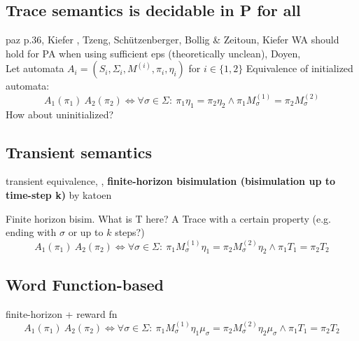         \subsection{Trace semantics is decidable in P for all}
                \begin{definition}
                 
                \end{definition}

                paz p.36, Kiefer  , Tzeng, Schützenberger, Bollig \& Zeitoun, Kiefer WA should hold for PA when using sufficient eps (theoretically unclean), Doyen, \\
                Let automata $A_i = \left( S_i, \Sigma_i, M^{(i)}, \pi_i, \eta_i \right)$ for $i \in \{1, 2\}$
                Equivalence of initialized automata:
                \[ A_1(\pi_1) ~ A_2(\pi_2) \Leftrightarrow \forall \sigma \in \Sigma: \ \pi_1 \eta_1 = \pi_2 \eta_2 \wedge \pi_1 M^{(1)}_{\sigma} = \pi_2 M^{(2)}_{\sigma}  \]
                How about uninitialized?  \\
                
        \subsection{Transient semantics}
        \begin{definition}
         transient equivalence, , \textbf{finite-horizon bisimulation (bisimulation up to time-step k)} by katoen
        \end{definition}

            Finite horizon bisim.
            What is T here? A Trace with a certain property (e.g. ending with $\sigma$ or up to $k$ steps?)
            \[ A_1(\pi_1) ~ A_2(\pi_2) \Leftrightarrow \forall \sigma \in \Sigma: \ \pi_1 M^{(1)}_{\sigma} \eta_1 = \pi_2 M^{(2)}_{\sigma} \eta_2 \wedge \pi_1 T_1 = \pi_2  T_2 \]
            
        \subsection{Word Function-based}
            finite-horizon + reward fn
            \[ A_1(\pi_1) ~ A_2(\pi_2) \Leftrightarrow \forall \sigma \in \Sigma: \ \pi_1 M^{(1)}_{\sigma} \eta_1 \mu_{\sigma} = \pi_2 M^{(2)}_{\sigma} \eta_2 \mu_{\sigma} \wedge \pi_1 T_1 = \pi_2  T_2 \]    
        
            
     
